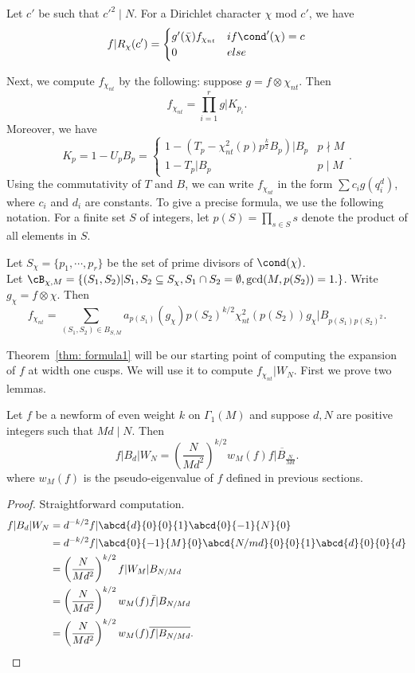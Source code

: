 \documentclass [11pt, proquest] {uwthesis}[2015/03/03]
\begin{document}
\begin{Lemma}\cite[Prop 2.6]{delaunay2002thesis}
Let $c'$ be such that $c'^2 \mid N$. For a Dirichlet character $\chi$ mod $c'$, we have
$$f|R_{\chi}(c') = \begin{cases} g'(\bar{\chi}) f_{\chi_{nt}} & if \cond'(\chi) = c \\ 0 & else  \end{cases}$$
\end{Lemma}


Next, we compute $f_{\chi_{nt}}$ by the following: suppose $g  = f \otimes \chi_{nt}$. Then 
\[
	f_{\chi_{nt}} = \prod_{i=1}^r g | K_{p_i}.
\]
Moreover, we have $$K_{p} = 1  - U_{p} B_p =  \begin{cases} 1- (T_p - \chi_{nt}^2(p) p^{\frac{k}{2}} B_p) |B_p & p \nmid M \\  1 - T_p |B_p & p \mid M \end{cases}.$$ Using the commutativity of $T$ and $B$, we can write  $f_{\chi_{nt}}$ in the form $\sum c_i g(q^d_i)$, where $c_i$ and $d_i$ are constants. To give a precise formula, we use the following notation. For a finite set $S$ of integers, let $p(S) = \prod_{s \in S} s$ denote the product of all elements in $S$.


\begin{theorem} \label{thm: formula1}
Let $S_\chi = \{ p_1, \cdots, p_r\}$ be the set of prime divisors of $\cond(\chi)$. \\
Let $\cB_{\chi,M} = \{(S_1, S_2) | S_1, S_2 \subseteq S_\chi, S_1 \cap S_2 = \emptyset, \gcd(M, p(S_2)) = 1. \}$. Write $g_\chi = f \otimes \chi$. Then
	$$f_{\chi_{nt}} =  \sum_{(S_1, S_2) \in B_{S,M}} a_{p(S_1)}(g_\chi)  p(S_2)^{k/2} \chi_{nt}^2(p(S_2)) g_\chi | B_{p(S_1) p(S_2)^2}.$$
\end{theorem}

Theorem~\ref{thm: formula1} will be our starting point of computing the expansion of $f$ at width one cusps. 
We will use it to compute $f_{\chi_{nt}} | W_N$.  First we prove two lemmas. 
\begin{Lemma} \label{lemma: bdwn}
Let $f$ be a newform of even weight $k$ on $\Gamma_1(M)$ and suppose $d, N$ are positive integers such that $Md \mid N$. Then
   $$f| B_d|W_N = \left(\frac{N}{Md^2} \right)^{k/2}  w_M(f)  \overline{f|B_{\frac{N}{Md}}}.$$
   where $w_M(f)$ is the pseudo-eigenvalue of $f$ defined in previous sections. 
\end{Lemma}
\begin{proof} Straightforward computation.
\begin{align*}
f |B_d | W_N & = d^{-k/2} f | \abcd{d}{0}{0}{1} \abcd{0}{-1}{N}{0} \\ 
& = d^{-k/2} f| \abcd{0}{-1}{M}{0} \abcd{N/md}{0}{0}{1} \abcd{d}{0}{0}{d} \\
& = \left( \frac{N}{Md^2} \right)^{k/2} f | W_M | B_{N/Md} \\
& = \left( \frac{N}{Md^2} \right)^{k/2} w_M(f) \bar{f} | B_{N/Md} \\ 
& = \left( \frac{N}{Md^2} \right)^{k/2} w_M(f) \overline{f | B_{N/Md}}.
\end{align*}
\end{proof}
\end{document}
